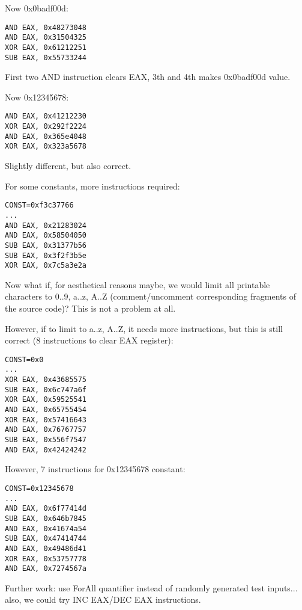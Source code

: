 Now 0x0badf00d:

\begin{lstlisting}
AND EAX, 0x48273048
AND EAX, 0x31504325
XOR EAX, 0x61212251
SUB EAX, 0x55733244
\end{lstlisting}

First two AND instruction clears EAX, 3th and 4th makes 0x0badf00d value.

Now 0x12345678:

\begin{lstlisting}
AND EAX, 0x41212230
XOR EAX, 0x292f2224
AND EAX, 0x365e4048
XOR EAX, 0x323a5678
\end{lstlisting}

Slightly different, but also correct.

For some constants, more instructions required:

\begin{lstlisting}
CONST=0xf3c37766
...
AND EAX, 0x21283024
AND EAX, 0x58504050
SUB EAX, 0x31377b56
SUB EAX, 0x3f2f3b5e
XOR EAX, 0x7c5a3e2a
\end{lstlisting}

Now what if, for aesthetical reasons maybe, we would limit all printable characters to 0..9, a..z, A..Z (comment/uncomment
corresponding fragments of the source code)?
This is not a problem at all.

However, if to limit to a..z, A..Z, it needs more instructions, but this is still correct
(8 instructions to clear EAX register):

\begin{lstlisting}
CONST=0x0
...
XOR EAX, 0x43685575
SUB EAX, 0x6c747a6f
XOR EAX, 0x59525541
AND EAX, 0x65755454
XOR EAX, 0x57416643
AND EAX, 0x76767757
SUB EAX, 0x556f7547
AND EAX, 0x42424242
\end{lstlisting}

However, 7 instructions for 0x12345678 constant:

\begin{lstlisting}
CONST=0x12345678
...
AND EAX, 0x6f77414d
SUB EAX, 0x646b7845
AND EAX, 0x41674a54
SUB EAX, 0x47414744
AND EAX, 0x49486d41
XOR EAX, 0x53757778
AND EAX, 0x7274567a
\end{lstlisting}

Further work: use ForAll quantifier instead of randomly generated test inputs...
also, we could try INC EAX/DEC EAX instructions.

